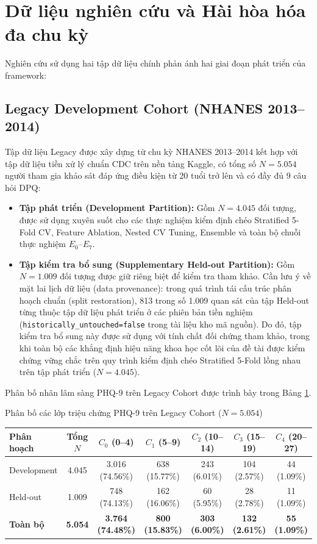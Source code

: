 \section{Dữ liệu nghiên cứu và Hài hòa hóa đa chu kỳ}
\label{sec:du-lieu-nghien-cuu}

Nghiên cứu sử dụng hai tập dữ liệu chính phản ánh hai giai đoạn phát triển của framework:

\subsection{Legacy Development Cohort (NHANES 2013--2014)}
Tập dữ liệu Legacy được xây dựng từ chu kỳ NHANES 2013--2014 kết hợp với tập dữ liệu tiền xử lý chuẩn CDC trên nền tảng Kaggle, có tổng số $N = 5.054$ người tham gia khảo sát đáp ứng điều kiện từ 20 tuổi trở lên và có đầy đủ 9 câu hỏi DPQ:
\begin{itemize}
    \item \textbf{Tập phát triển (Development Partition):} Gồm $N = 4.045$ đối tượng, được sử dụng xuyên suốt cho các thực nghiệm kiểm định chéo Stratified 5-Fold CV, Feature Ablation, Nested CV Tuning, Ensemble và toàn bộ chuỗi thực nghiệm $E_0$--$E_7$.
    \item \textbf{Tập kiểm tra bổ sung (Supplementary Held-out Partition):} Gồm $N = 1.009$ đối tượng được giữ riêng biệt để kiểm tra tham khảo. Cần lưu ý về mặt lai lịch dữ liệu (data provenance): trong quá trình tái cấu trúc phân hoạch chuẩn (split restoration), 813 trong số 1.009 quan sát của tập Held-out từng thuộc tập dữ liệu phát triển ở các phiên bản tiền nghiệm (\texttt{historically\_untouched=false} trong tài liệu kho mã nguồn). Do đó, tập kiểm tra bổ sung này được sử dụng với tính chất đối chứng tham khảo, trong khi toàn bộ các khẳng định hiệu năng khoa học cốt lõi của đề tài được kiểm chứng vững chắc trên quy trình kiểm định chéo Stratified 5-Fold lồng nhau trên tập phát triển ($N = 4.045$).
\end{itemize}

Phân bố nhãn lâm sàng PHQ-9 trên Legacy Cohort được trình bày trong Bảng \ref{tab:legacy-class-dist}.

\begin{table}{Phân bố các lớp triệu chứng PHQ-9 trên Legacy Cohort ($N = 5.054$)}
\centering
\label{tab:legacy-class-dist}
\begin{tabular}{l c c c c c c}
\toprule
\textbf{Phân hoạch} & \textbf{Tổng $N$} & \textbf{$C_0$ (0--4)} & \textbf{$C_1$ (5--9)} & \textbf{$C_2$ (10--14)} & \textbf{$C_3$ (15--19)} & \textbf{$C_4$ (20--27)} \\
\midrule
Development & 4.045 & 3.016 (74.56\%) & 638 (15.77\%) & 243 (6.01\%) & 104 (2.57\%) & 44 (1.09\%) \\
Held-out & 1.009 & 748 (74.13\%) & 162 (16.06\%) & 60 (5.95\%) & 28 (2.78\%) & 11 (1.09\%) \\
\midrule
\textbf{Toàn bộ} & \textbf{5.054} & \textbf{3.764 (74.48\%)} & \textbf{800 (15.83\%)} & \textbf{303 (6.00\%)} & \textbf{132 (2.61\%)} & \textbf{55 (1.09\%)} \\
\bottomrule
\end{tabular}
\end{table}

